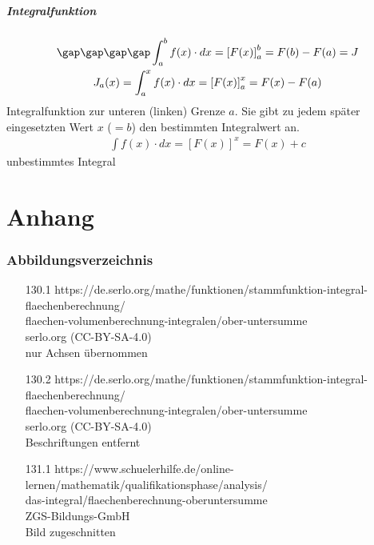 \subsubsection{Integralfunktion}
\begin{gather*}
  \gap\gap\gap\gap \int_a^b f(x) \cdot dx = \left[F(x)\right]_a^b = F(b) - F(a) = J \\
  J_a(x) = \int_a^x f(x) \cdot dx = \left[F(x)\right]_a^x = F(x) - F(a)
\end{gather*}
Integralfunktion zur unteren (linken) Grenze $a$. Sie gibt zu jedem später eingesetzten Wert $x$ ($= b$) den bestimmten Integralwert an.
\begin{gather*}
  \int f(x) \cdot dx = \left[F(x)\right]^x = F(x) + c
\end{gather*}
unbestimmtes Integral

\part{Anhang}
\section{Abbildungsverzeichnis}
\begin{enumerate}
  \item [130.1] https://de.serlo.org/mathe/funktionen/stammfunktion-integral-flaechenberechnung/\\flaechen-volumenberechnung-integralen/ober-untersumme \\ serlo.org (CC-BY-SA-4.0) \\ nur Achsen übernommen
  \item [130.2]https://de.serlo.org/mathe/funktionen/stammfunktion-integral-flaechenberechnung/\\flaechen-volumenberechnung-integralen/ober-untersumme \\ serlo.org (CC-BY-SA-4.0) \\ Beschriftungen entfernt
  \item [131.1]https://www.schuelerhilfe.de/online-lernen/mathematik/qualifikationsphase/analysis/\\das-integral/flaechenberechnung-oberuntersumme \\ ZGS-Bildungs-GmbH \\ Bild zugeschnitten
\end{enumerate}


